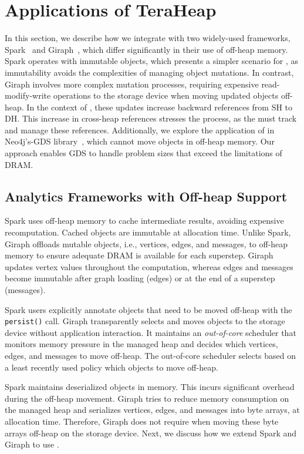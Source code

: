 \section{Applications of TeraHeap}

In this section, we describe how we integrate \teraheapName{} with two widely-used
frameworks, Spark~\cite{zaharia:spark} and Giraph~\cite{giraph}, which differ
significantly in their use of off-heap memory. Spark operates with immutable
objects, which presents a simpler scenario for \teraheapName{}, as immutability avoids
the complexities of managing object mutations. In contrast, Giraph involves more
complex mutation processes, requiring expensive read-modify-write operations to
the storage device when moving updated objects off-heap. In the context of
\teraheapName{}, these updates increase backward references from SH to DH. This increase
in cross-heap references stresses the \teraheapGC{} process, as the \teraheapGC{} must track and
manage these references. Additionally, we explore the application of \teraheapName{} in
Neo4j's-GDS library~\cite{gds}, which cannot move objects in off-heap memory.
Our approach enables GDS to handle problem sizes that exceed the limitations of
DRAM.

\subsection{Analytics Frameworks with Off-heap Support}

Spark uses off-heap memory to cache intermediate results, avoiding
expensive recomputation. Cached objects are immutable at allocation
time. Unlike Spark, Giraph offloads mutable objects, i.e., vertices,
edges, and messages, to off-heap memory to ensure adequate DRAM is
available for each superstep. Giraph updates vertex values throughout
the computation, whereas edges and messages become immutable after
graph loading (edges) or at the end of a superstep (messages).

Spark users explicitly annotate objects that need to be moved off-heap
with the \texttt{persist()} call. Giraph transparently selects and
moves objects to the storage device without application interaction.
It maintains an \emph{out-of-core} scheduler that monitors memory
pressure in the managed heap and decides which vertices, edges, and
messages to move off-heap. The out-of-core scheduler selects based on
a least recently used policy which objects to move off-heap.

Spark maintains deserialized objects in memory. This incurs
significant \teraheapSD overhead during the off-heap movement. Giraph tries
to reduce memory consumption on the managed heap and serializes
vertices, edges, and messages into byte arrays, at allocation time.
Therefore, Giraph does not require \teraheapSD when moving these byte arrays
off-heap on the storage device.
%
Next, we discuss how we extend Spark and Giraph to use \teraheapName{}.


